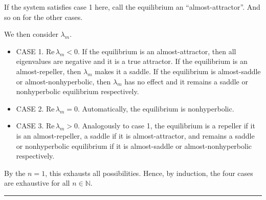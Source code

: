 \documentclass[12pt]{article}
\newcommand{\N}{\mathbb{N}}
\renewcommand{\div}{\vspace*{10pt}\hrule\vspace*{10pt}}
\renewcommand{\Re}{\text{Re}\,}
\begin{document}
\begin{enumerate}[(i)]
          If the system satisfies case 1 here, call the equilibrium an ``almost-attractor''. And so on for the other cases.

          We then consider $\lambda_m$.
          \begin{itemize}
              \item CASE 1. $\Re \lambda_m < 0$. If the equilibrium is an almost-attractor, then all eigenvalues are negative and it is a true attractor. If the equilibrium is an almost-repeller, then $\lambda_m$ makes it a saddle. If the equilibrium is almost-saddle or almost-nonhyperbolic, then $\lambda_m$ has no effect and it remains a saddle or nonhyperbolic equilibrium respectively.
              \item CASE 2. $\Re \lambda_m = 0$. Automatically, the equilibrium is nonhyperbolic.
              \item CASE 3. $\Re \lambda_m > 0$. Analogously to case 1, the equilibrium is a repeller if it is an almost-repeller, a saddle if it is almost-attractor, and remains a saddle or nonhyperbolic equilibrium if it is almost-saddle or almost-nonhyperbolic respectively.
          \end{itemize}

          By the $n=1$, this exhausts all possibilities. Hence, by induction, the four cases are exhaustive for all $n \in \N$.

          \div

          \begin{center}
              \color{black}
\end{center}
\end{enumerate}
\end{document}
